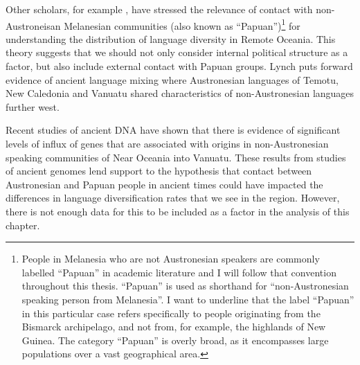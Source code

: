 \documentclass[a4paper,10pt]{article} %
\begin{document}
Other scholars, for example \citet[104]{lynch1981melanesian}, have stressed the relevance of contact with non-Austroneisan Melanesian communities (also known as ``Papuan'')\footnote{People in Melanesia who are not Austronesian speakers are commonly labelled ``Papuan'' in academic literature and I will follow that convention throughout this thesis. ``Papuan'' is used as shorthand for ``non-Austronesian speaking person from Melanesia''. I want to underline that the label ``Papuan'' in this particular case refers specifically to people originating from the Bismarck archipelago, and not from, for example, the highlands of New Guinea. The category ``Papuan'' is overly broad, as it encompasses large populations over a vast geographical area.} for understanding the distribution of language diversity in Remote Oceania. This theory suggests that we should not only consider internal political structure as a factor, but also include external contact with Papuan groups. Lynch puts forward evidence of ancient language mixing where Austronesian languages of Temotu, New Caledonia and Vanuatu shared characteristics of non-Austronesian languages further west. 

Recent studies of ancient DNA \citep{lipson_harvad_ancient_dna_vanuatu_2018, posth_jena_ancient_dna_vanuatu_2018} have shown that there is evidence of significant levels of influx of genes that are associated with origins in non-Austronesian speaking communities of Near Oceania into Vanuatu. These results from studies of ancient genomes lend support to the hypothesis that contact between Austronesian and Papuan people in ancient times could have impacted the differences in language diversification rates that we see in the region. However, there is not enough data for this to be included as a factor in the analysis of this chapter.


\end{document}
